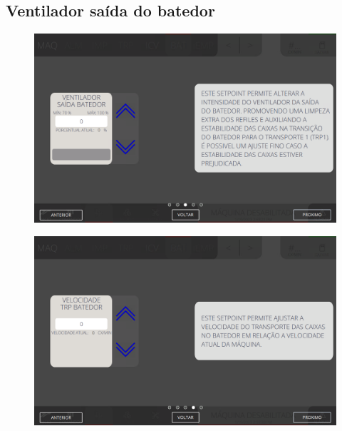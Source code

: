 \newpage
\thispagestyle{fancy}
\vspace{\fill}
\subsection{\small Ventilador saída do batedor}
\begin{figure}
    \centering
    \includegraphics[width=576 px,height=360 px]{src/imagesICV/07-scout/settings/e-3.png}
\end{figure}

\newpage
\thispagestyle{fancy}
\vspace{\fill}
\begin{figure}
    \centering
    \includegraphics[width=480 px,height=300 px]{src/imagesICV/07-scout/settings/e-4.png}
\end{figure}

